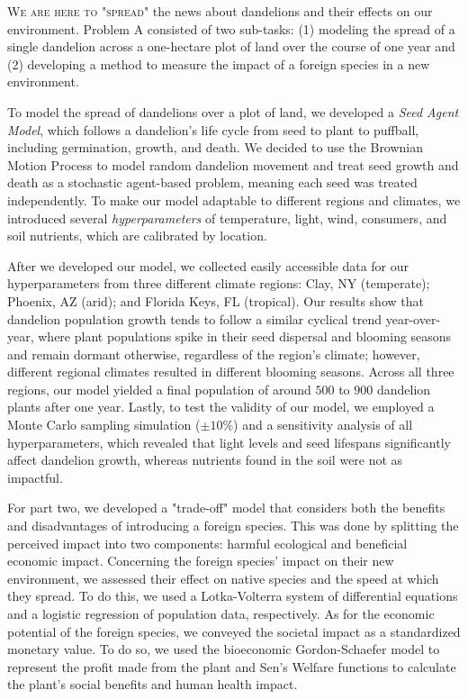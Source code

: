 \textsc{We are here to "spread"} the news about dandelions and their effects on our environment. Problem A consisted of two sub-tasks: (1) modeling the spread of a single dandelion across a one-hectare plot of land over the course of one year and (2) developing a method to measure the impact of a foreign species in a new environment. 
  
To model the spread of dandelions over a plot of land, we developed a \textit{Seed Agent Model}, which follows a dandelion's life cycle from seed to plant to puffball, including germination, growth, and death. We decided to use the Brownian Motion Process to model random dandelion movement and treat seed growth and death as a stochastic agent-based problem, meaning each seed was treated independently. To make our model adaptable to different regions and climates, we introduced several \textit{hyperparameters} of temperature, light, wind, consumers, and soil nutrients, which are calibrated by location.

After we developed our model, we collected easily accessible data for our hyperparameters from three different climate regions: Clay, NY (temperate); Phoenix, AZ (arid); and Florida Keys, FL (tropical). Our results show that dandelion population growth tends to follow a similar cyclical trend year-over-year, where plant populations spike in their seed dispersal and blooming seasons and remain dormant otherwise, regardless of the region's climate; however, different regional climates resulted in different blooming seasons. Across all three regions, our model yielded a final population of around \(500\) to \(900\) dandelion plants after one year. Lastly, to test the validity of our model, we employed a Monte Carlo sampling simulation (\(\pm 10\%\)) and a sensitivity analysis of all hyperparameters, which revealed that light levels and seed lifespans significantly affect dandelion growth, whereas nutrients found in the soil were not as impactful.

For part two, we developed a "trade-off" model that considers both the benefits and disadvantages of introducing a foreign species. This was done by splitting the perceived impact into two components: harmful ecological and beneficial economic impact. Concerning the foreign species' impact on their new environment, we assessed their effect on native species and the speed at which they spread. To do this, we used a Lotka-Volterra system of differential equations and a logistic regression of population data, respectively. As for the economic potential of the foreign species, we conveyed the societal impact as a standardized monetary value. To do so, we used the bioeconomic Gordon-Schaefer model to represent the profit made from the plant and Sen's Welfare functions to calculate the plant's social benefits and human health impact. 

